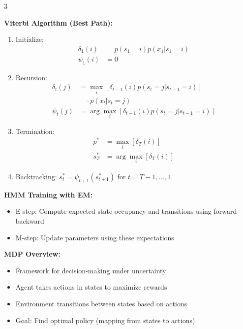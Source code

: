 \documentclass[10pt,landscape]{article}
\begin{document}
\begin{multicols}{3}
\begin{tcolorbox}[breakable, title=9.1 Forward-Backward Algorithm for HMMs, colback=hmm]
\textbf{Viterbi Algorithm (Best Path):}
\begin{enumerate}[leftmargin=*,noitemsep,topsep=0pt]
    \item Initialize:
    \begin{align}
    \delta_1(i) &= p(s_1 = i)p(x_1|s_1 = i)\\
    \psi_1(i) &= 0
    \end{align}
    
    \item Recursion:
    \begin{align}
    \delta_t(j) &= \max_i [\delta_{t-1}(i)p(s_t = j|s_{t-1} = i)]\\
    &\quad\cdot p(x_t|s_t = j)\\
    \psi_t(j) &= \arg\max_i [\delta_{t-1}(i)p(s_t = j|s_{t-1} = i)]
    \end{align}
    
    \item Termination:
    \begin{align}
    p^* &= \max_i [\delta_T(i)]\\
    s^*_T &= \arg\max_i [\delta_T(i)]
    \end{align}
    
    \item Backtracking:
    $s^*_t = \psi_{t+1}(s^*_{t+1})$ for $t = T-1,...,1$
\end{enumerate}

\textbf{HMM Training with EM:}
\begin{itemize}[leftmargin=*,noitemsep,topsep=0pt]
    \item E-step: Compute expected state occupancy and transitions using forward-backward
    \item M-step: Update parameters using these expectations
\end{itemize}
\end{tcolorbox}

\begin{tcolorbox}[breakable, title=10. Markov Decision Processes Concepts, colback=mdp]
\textbf{MDP Overview:}
\begin{itemize}[leftmargin=*,noitemsep,topsep=0pt]
    \item Framework for decision-making under uncertainty
    \item Agent takes actions in states to maximize rewards
    \item Environment transitions between states based on actions
    \item Goal: Find optimal policy (mapping from states to actions)
\end{itemize}


\end{tcolorbox}
\end{multicols}
\end{document}
